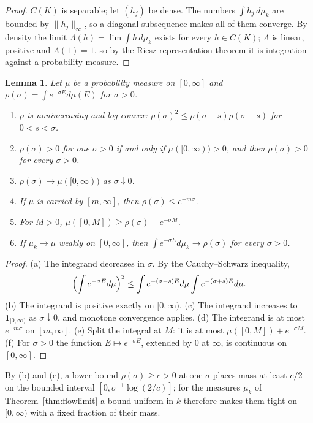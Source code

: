 \documentclass[aps,prd,twocolumn,superscriptaddress,nofootinbib,longbibliography,floatfix,amsmath,amssymb,10pt]{revtex4-2}
\newtheorem{lemma}[theorem]{Lemma}
\theoremstyle{definition}
\theoremstyle{remark}
\begin{document}
\begin{proof}
$C(K)$ is separable; let $(h_j)$ be dense. The numbers $\int h_j\,d\mu_k$ are
bounded by $\|h_j\|_\infty$, so a diagonal subsequence makes all of them
converge. By density the limit $\Lambda(h)=\lim\int h\,d\mu_k$ exists for
every $h\in C(K)$; $\Lambda$ is linear, positive and $\Lambda(1)=1$, so by
the Riesz representation theorem it is integration against a probability
measure.
\end{proof}

\begin{lemma}\label{lem:laplace}
Let $\mu$ be a probability measure on $[0,\infty]$ and
$\rho(\sigma)=\int e^{-\sigma E}d\mu(E)$ for $\sigma>0$.
\begin{enumerate}[label=\textup{(\alph*)},leftmargin=*]
\item $\rho$ is nonincreasing and log-convex:
$\rho(\sigma)^2\le\rho(\sigma-s)\rho(\sigma+s)$ for $0<s<\sigma$.
\item $\rho(\sigma)>0$ for one $\sigma>0$ if and only if
$\mu([0,\infty))>0$, and then $\rho(\sigma)>0$ for every $\sigma>0$.
\item $\rho(\sigma)\to\mu([0,\infty))$ as $\sigma\downarrow0$.
\item If $\mu$ is carried by $[m,\infty]$, then $\rho(\sigma)\le
e^{-m\sigma}$.
\item For $M>0$, $\mu([0,M])\ge\rho(\sigma)-e^{-\sigma M}$.
\item If $\mu_k\to\mu$ weakly on $[0,\infty]$, then $\int e^{-\sigma
E}d\mu_k\to\rho(\sigma)$ for every $\sigma>0$.
\end{enumerate}
\end{lemma}

\begin{proof}
(a) The integrand decreases in $\sigma$. By the Cauchy--Schwarz
inequality,
\[
\Bigl(\int e^{-\sigma E}d\mu\Bigr)^2\le\int e^{-(\sigma-s)E}d\mu\int
e^{-(\sigma+s)E}d\mu .
\]
(b) The integrand is positive exactly on
$[0,\infty)$. (c) The integrand increases to $\mathbf 1_{[0,\infty)}$ as
$\sigma\downarrow0$, and monotone convergence applies. (d) The integrand
is at most $e^{-m\sigma}$ on $[m,\infty]$. (e) Split the integral at $M$:
it is at most $\mu([0,M])+e^{-\sigma M}$. (f) For $\sigma>0$ the function
$E\mapsto e^{-\sigma E}$, extended by $0$ at $\infty$, is continuous on
$[0,\infty]$.
\end{proof}

By (b) and (e), a lower bound $\rho(\sigma)\ge c>0$ at one $\sigma$ places
mass at least $c/2$ on the bounded interval $[0,\sigma^{-1}\log(2/c)]$; for
the measures $\mu_k$ of Theorem~\ref{thm:flowlimit} a bound uniform in $k$
therefore makes them tight on $[0,\infty)$ with a fixed fraction of their
mass.
\end{document}
